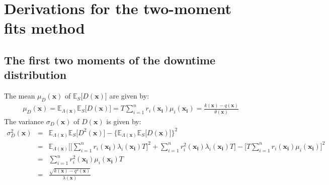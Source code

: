 \documentclass[preprint,12pt]{elsarticle}
\begin{document}
\begin{appendices}
\begin{description}
\end{description}

\section{Derivations for the two-moment fits method}
\label{AG}
\subsection{The first two moments of the downtime distribution}
The mean $\mu_{D}(\boldsymbol{x})$ of $\mathbb{E}_{S}\bigg[D(\boldsymbol{x})\bigg]$ are given by:
\begin{eqnarray}
\mu_{D}(\boldsymbol{x})=\mathbb{E}_{\Lambda(\boldsymbol{x})}\mathbb{E}_{S} \bigg[D(\boldsymbol{x}) \bigg]=T\sum_{i=1}^{n}{r_{i}(\boldsymbol{x_i})\mu_{i}(\boldsymbol{x_i})}=\frac{k(\boldsymbol{x})-q(\boldsymbol{x})}{\theta(\boldsymbol{x})}
\label{muD}
\end{eqnarray}
The variance $\sigma_{D}(\boldsymbol{x})$ of $D(\boldsymbol{x})$ is given by:
\begin{eqnarray}
\sigma^{2}_{D}(\boldsymbol{x})&=&\mathbb{E}_{\Lambda(\boldsymbol{x})}\mathbb{E}_{S} \bigg[D^{2}(\boldsymbol{x}) \bigg]- \bigg\{\mathbb{E}_{\Lambda(\boldsymbol{x})}\mathbb{E}_{S}\bigg[D(\boldsymbol{x}) \bigg] \bigg\}^{2} \nonumber\\
&=& \mathbb{E}_{\Lambda(\boldsymbol{x})}\bigg[\bigg[\sum_{i=1}^{n}{r_{i}(\boldsymbol{x_{i}})\lambda_{i}(\boldsymbol{x_{i}})T}\bigg]^{2} +\sum_{i=1}^{n}{r_{i}^{2}(\boldsymbol{x_{i}})\lambda_{i}(\boldsymbol{x_{i}})T}\bigg]-\bigg[T\sum_{i=1}^{n}{r_{i}(\boldsymbol{x_i})\mu_{i}(\boldsymbol{x_i})}\bigg]^{2}\nonumber\\
&=&\sum_{i=1}^{n}{r_{i}^{2}(\boldsymbol{x_i})\mu_{i}(\boldsymbol{x_i})T}\nonumber\\
&=&\frac{\sqrt{k(\boldsymbol{x})-q^{2}(\boldsymbol{x})}}{\lambda(\boldsymbol{x})}
\end{eqnarray}

\end{appendices}
\end{document}
